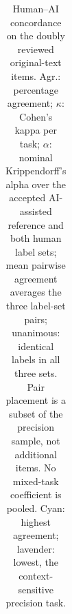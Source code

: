 \begin{table}[t]
\begin{tabular}{@{}lrcccccccccc@{}}
\bottomrule
\end{tabular}
\caption{Human--AI concordance on the  doubly reviewed original-text items.
Agr.: percentage agreement; $\kappa$: Cohen's kappa per task; $\alpha$: nominal
Krippendorff's alpha over the accepted AI-assisted reference and both human label sets;
mean pairwise agreement averages the three label-set pairs; unanimous: identical labels in
all three sets. Pair placement is a subset of the precision sample, not additional items.
No mixed-task coefficient is pooled. Cyan: highest agreement; lavender: lowest, the
context-sensitive precision task.}
\label{tab:human-concordance}
\end{table}
